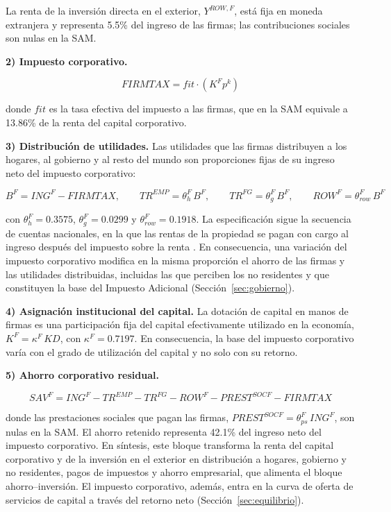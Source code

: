 \documentclass[11pt]{article}
\begin{document}
La renta de la inversión directa en el exterior, $Y^{ROW,F}$, está fija en moneda extranjera y representa 5.5\% del ingreso de las firmas; las contribuciones sociales son nulas en la SAM.

\textbf{2) Impuesto corporativo.}

\[
FIRMTAX = fit\cdot\left(K^{F}p^{k}\right)
\]

donde $fit$ es la tasa efectiva del impuesto a las firmas, que en la SAM equivale a 13.86\% de la renta del capital corporativo.

\textbf{3) Distribución de utilidades.} Las utilidades que las firmas distribuyen a los hogares, al gobierno y al resto del mundo son proporciones fijas de su ingreso neto del impuesto corporativo:

\[
B^{F}=ING^{F}-FIRMTAX,\qquad
TR^{EMP}=\theta_{h}^{F}\, B^{F},\qquad TR^{FG}=\theta_{g}^{F}\, B^{F},\qquad ROW^{F}=\theta_{row}^{F}\, B^{F}
\]

con $\theta_{h}^{F}=0.3575$, $\theta_{g}^{F}=0.0299$ y $\theta_{row}^{F}=0.1918$. La especificación sigue la secuencia de cuentas nacionales, en la que las rentas de la propiedad se pagan con cargo al ingreso después del impuesto sobre la renta \cite{sna_2008}. En consecuencia, una variación del impuesto corporativo modifica en la misma proporción el ahorro de las firmas y las utilidades distribuidas, incluidas las que perciben los no residentes y que constituyen la base del Impuesto Adicional (Sección~\ref{sec:gobierno}).

\textbf{4) Asignación institucional del capital.} La dotación de capital en manos de firmas es una participación fija del capital efectivamente utilizado en la economía, $K^{F}=\kappa^{F}\, KD$, con $\kappa^{F}=0.7197$. En consecuencia, la base del impuesto corporativo varía con el grado de utilización del capital y no solo con su retorno.

\textbf{5) Ahorro corporativo residual.}

\[
SAV^{F}=ING^{F}-TR^{EMP}-TR^{FG}-ROW^{F}-PREST^{SOCF}-FIRMTAX
\]

donde las prestaciones sociales que pagan las firmas, $PREST^{SOCF}=\theta_{ps}^{F}\,ING^{F}$, son nulas en la SAM. El ahorro retenido representa 42.1\% del ingreso neto del impuesto corporativo. En síntesis, este bloque transforma la renta del capital corporativo y de la inversión en el exterior en distribución a hogares, gobierno y no residentes, pagos de impuestos y ahorro empresarial, que alimenta el bloque ahorro--inversión. El impuesto corporativo, además, entra en la curva de oferta de servicios de capital a través del retorno neto (Sección~\ref{sec:equilibrio}).
\end{document}
